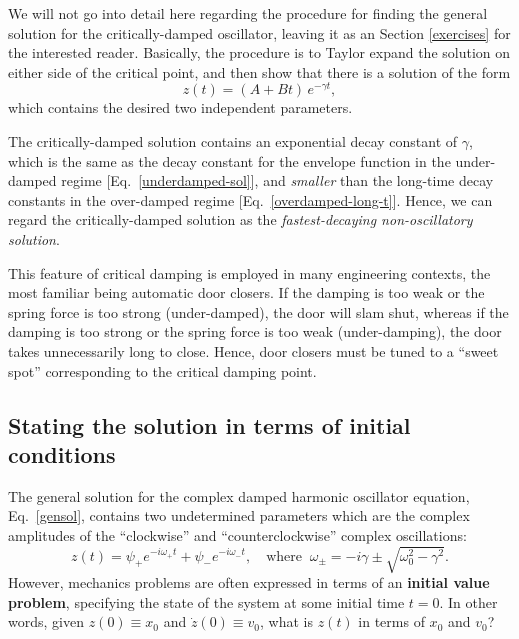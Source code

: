 \documentclass[10pt,a4paper]{article}
\begin{document}
We will not go into detail here regarding the procedure for finding the
general solution for the critically-damped oscillator, leaving it as an
Section \ref{exercises} for the interested reader. Basically, the
procedure is to Taylor expand the solution on either side of the
critical point, and then show that there is a solution of the form
\begin{equation}
z(t) = \left(A + B t\right)\, e^{-\gamma t},
\label{critical-sol}
\end{equation}
which contains the desired two independent parameters.

The critically-damped solution contains an exponential decay constant
of $\gamma$, which is the same as the decay constant for the envelope
function in the under-damped regime [Eq.~\eqref{underdamped-sol}], and
\emph{smaller} than the long-time decay constants in the over-damped
regime [Eq.~\eqref{overdamped-long-t}]. Hence, we can regard the
critically-damped solution as the \emph{fastest-decaying
  non-oscillatory solution}.

This feature of critical damping is employed in many engineering
contexts, the most familiar being automatic door closers. If the
damping is too weak or the spring force is too strong (under-damped),
the door will slam shut, whereas if the damping is too strong or the
spring force is too weak (under-damping), the door takes unnecessarily
long to close. Hence, door closers must be tuned to a ``sweet spot''
corresponding to the critical damping point.

\subsection{Stating the solution in terms of initial conditions}
\label{stating-the-solution-in-terms-of-initial-conditions}

The general solution for the complex damped harmonic oscillator
equation, Eq.~\eqref{gensol}, contains two undetermined parameters
which are the complex amplitudes of the ``clockwise'' and
``counterclockwise'' complex oscillations:
\begin{equation}
z(t) = \psi_+ e^{-i\omega_+ t} + \psi_- e^{-i\omega_- t}, \quad\mathrm{where} \;\; \omega_\pm =  -i\gamma  \pm \sqrt{\omega_0^2 - \gamma^2}.
\end{equation}
However, mechanics problems are often expressed in terms of an
\textbf{initial value problem}, specifying the state of the system at
some initial time $t = 0$. In other words, given $z(0) \equiv x_0$
and $\dot{z}(0) \equiv v_0$, what is $z(t)$ in terms of $x_0$ and
$v_0$?
\end{document}
